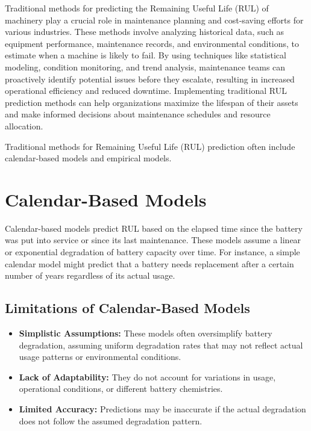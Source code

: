 Traditional methods for predicting the Remaining Useful Life (RUL) of machinery play a crucial role in maintenance planning and cost-saving efforts for various industries. These methods involve analyzing historical data, such as equipment performance, maintenance records, and environmental conditions, to estimate when a machine is likely to fail. By using techniques like statistical modeling, condition monitoring, and trend analysis, maintenance teams can proactively identify potential issues before they escalate, resulting in increased operational efficiency and reduced downtime. Implementing traditional RUL prediction methods can help organizations maximize the lifespan of their assets and make informed decisions about maintenance schedules and resource allocation.

Traditional methods for Remaining Useful Life (RUL) prediction often include calendar-based models and empirical models.

\section{Calendar-Based Models}

Calendar-based models predict RUL based on the elapsed time since the battery was put into service or since its last maintenance. These models assume a linear or exponential degradation of battery capacity over time. For instance, a simple calendar model might predict that a battery needs replacement after a certain number of years regardless of its actual usage.

\subsection{Limitations of Calendar-Based Models}

\begin{itemize}
    \item \textbf{Simplistic Assumptions:} These models often oversimplify battery degradation, assuming uniform degradation rates that may not reflect actual usage patterns or environmental conditions.
    \item \textbf{Lack of Adaptability:} They do not account for variations in usage, operational conditions, or different battery chemistries.
    \item \textbf{Limited Accuracy:} Predictions may be inaccurate if the actual degradation does not follow the assumed degradation pattern.
\end{itemize}


